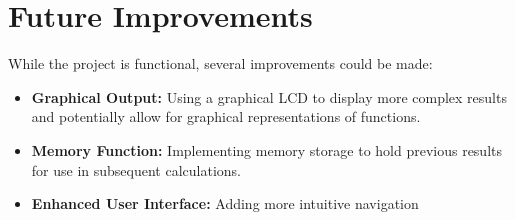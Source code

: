 \documentclass[12pt]{article}
\begin{document}
\section{Future Improvements}
While the project is functional, several improvements could be made:
\begin{itemize}
    \item \textbf{Graphical Output:} Using a graphical LCD to display more complex results and potentially allow for graphical representations of functions.
    \item \textbf{Memory Function:} Implementing memory storage to hold previous results for use in subsequent calculations.
    \item \textbf{Enhanced User Interface:} Adding more intuitive navigation
\end{itemize}
\end{document}
